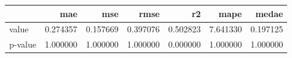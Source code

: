 \begin{tabular}{lrrrrrr}
\toprule
 & mae & mse & rmse & r2 & mape & medae \\
\midrule
value & 0.274357 & 0.157669 & 0.397076 & 0.502823 & 7.641330 & 0.197125 \\
p-value & 1.000000 & 1.000000 & 1.000000 & 0.000000 & 1.000000 & 1.000000 \\
\bottomrule
\end{tabular}
